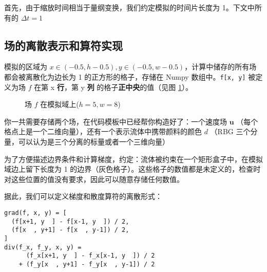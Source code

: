 \documentclass{ctexart}
\begin{document}
首先，由于缩放时间相当于量纲变换，我们约定模拟的时间片长度为 1。下文中所有的 $\Delta t = 1$

\subsection{场的离散表示和算符实现}

模拟的区域为 $x \in (-0.5, h-0.5), y \in (-0.5, w-0.5)$，计算中储存的所有场都会被离散化为边长为 1 的正方形的格子，存储在 Numpy 数组中。\texttt{f[x, y]} 被定义为场 $f$ 在第 x \textbf{行}，第 y \textbf{列} 的格子\textbf{正中央}的值（见图 \ref{fig:grid}）。

\begin{figure}[h!]
  \label{fig:grid}
  \centering

  \caption{场 $f$ 在模拟域上($h = 5, w = 8$)}
\end{figure}

你一共需要存储两个场，在代码模板中已经帮你构造好了：一个速度场 $\mathbf{u}$ （每个格点上是一个二维向量），还有一个表示流体中携带颜料的颜色 $d$ （RBG 三个分量，可以认为是三个分离的标量或者一个三维向量）

为了方便描述边界条件和计算梯度，约定：流体被约束在一个矩形盒子中，在模拟域边上留下长度为 1 的边界（灰色格子）。这些格子的数值都是未定义的，检查时对这些位置的值没有要求，因此可以随意存储任何数值。

据此，我们可以定义梯度和散度算符的离散形式：

\begin{verbatim}
grad(f, x, y) = [
  (f[x+1, y  ] - f[x-1, y  ]) / 2,
  (f[x  , y+1] - f[x  , y-1]) / 2,
]
div(f_x, f_y, x, y) =
      (f_x[x+1, y  ] - f_x[x-1, y  ]) / 2
    + (f_y[x  , y+1] - f_y[x  , y-1]) / 2
\end{verbatim}
\end{document}

